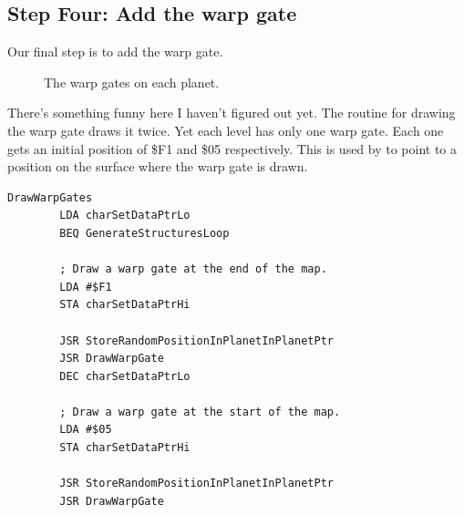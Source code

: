 \subsection{Step Four: Add the warp gate}

Our final step is to add the warp gate.
\begin{figure}[H]
  {
    \setlength{\tabcolsep}{3.0pt}
    \setlength\cmidrulewidth{\heavyrulewidth} %
    \begin{adjustbox}{width=15cm,center}
      \begin{subfigure}{0.3\textwidth}
        
      \end{subfigure}
      \begin{subfigure}{0.3\textwidth}
        
      \end{subfigure}
      \begin{subfigure}{0.3\textwidth}
        
      \end{subfigure}
      \begin{subfigure}{0.3\textwidth}
        
      \end{subfigure}
      \begin{subfigure}{0.3\textwidth}
        
      \end{subfigure}
    \end{adjustbox}
  }\caption[]{The warp gates on each planet.}
\end{figure}

There's something funny here I haven't figured out yet. The routine for drawing the warp gate
draws it twice. Yet each level has only one warp gate. Each one gets an initial position of
\$F1 and \$05 respectively. This is used by  to 
point to a position on the surface where the warp gate is drawn.

\begin{lstlisting}[caption=Why does it draw 2 warp gates when there's only 1? Haven't figured this out yet..]
DrawWarpGates   
        LDA charSetDataPtrLo
        BEQ GenerateStructuresLoop

        ; Draw a warp gate at the end of the map.
        LDA #$F1
        STA charSetDataPtrHi

        JSR StoreRandomPositionInPlanetInPlanetPtr
        JSR DrawWarpGate
        DEC charSetDataPtrLo

        ; Draw a warp gate at the start of the map.
        LDA #$05
        STA charSetDataPtrHi

        JSR StoreRandomPositionInPlanetInPlanetPtr
        JSR DrawWarpGate
\end{lstlisting}

